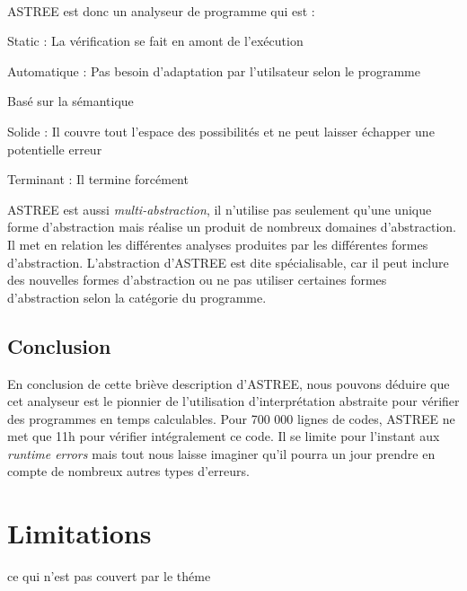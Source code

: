 \documentclass[french]{report}
\begin{document}
\paragraph{}
ASTREE est donc un analyseur de programme qui est :
\begin{description}
    \item Static : La vérification se fait en amont de l'exécution
    \item Automatique : Pas besoin d'adaptation par l'utilsateur selon le programme
    \item Basé sur la sémantique
    \item Solide : Il couvre tout l'espace des possibilités et ne peut laisser échapper une potentielle erreur
    \item Terminant : Il termine forcément
\end{description}
ASTREE est aussi \textit{multi-abstraction}, il n'utilise pas seulement qu'une unique forme d'abstraction mais réalise
un produit de nombreux domaines d'abstraction. Il met en relation les différentes analyses produites par les différentes
formes d'abstraction. L'abstraction d'ASTREE est dite spécialisable, car il peut inclure des nouvelles
formes d'abstraction ou ne pas utiliser certaines formes d'abstraction selon la catégorie du programme.


\subsection{Conclusion}
En conclusion de cette briève description d'ASTREE, nous pouvons déduire que cet analyseur est le pionnier de l'utilisation
d'interprétation abstraite pour vérifier des programmes en temps calculables. Pour 700 000 lignes
de codes, ASTREE ne met que 11h pour vérifier intégralement ce code.
Il se limite pour l'instant aux \textit{runtime errors} mais tout nous laisse imaginer qu'il
pourra un jour prendre en compte de nombreux autres types d'erreurs.


\section{Limitations}

ce qui n'est pas couvert par le théme
\end{document}
